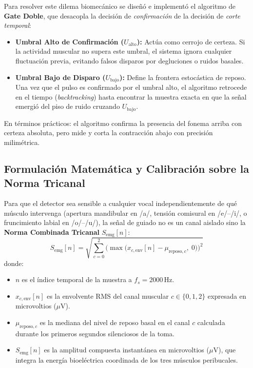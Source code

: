 \documentclass[11pt,a4paper,openany]{book}
\theoremstyle{definition}
\begin{document}
Para resolver este dilema biomecánico se diseñó e implementó el algoritmo de \textbf{Gate Doble}, que desacopla la decisión de \textit{confirmación} de la decisión de \textit{corte temporal}:
\begin{itemize}
    \item \textbf{Umbral Alto de Confirmación ($U_{\text{alto}}$):} Actúa como cerrojo de certeza. Si la actividad muscular no supera este umbral, el sistema ignora cualquier fluctuación previa, evitando falsos disparos por degluciones o ruidos basales.
    \item \textbf{Umbral Bajo de Disparo ($U_{\text{bajo}}$):} Define la frontera estocástica de reposo. Una vez que el pulso es confirmado por el umbral alto, el algoritmo retrocede en el tiempo (\textit{backtracking}) hasta encontrar la muestra exacta en que la señal emergió del piso de ruido cruzando $U_{\text{bajo}}$.
\end{itemize}
En términos prácticos: el algoritmo confirma la presencia del fonema arriba con certeza absoluta, pero mide y corta la contracción abajo con precisión milimétrica.

\subsection{Formulación Matemática y Calibración sobre la Norma Tricanal}
\label{subsec:matematica_gate_doble}

Para que el detector sea sensible a cualquier vocal independientemente de qué músculo intervenga (apertura mandibular en /a/, tensión comisural en /e/--/i/, o fruncimiento labial en /o/--/u/), la señal de guiado no es un canal aislado sino la \textbf{Norma Combinada Tricanal} $S_{\text{emg}}[n]$:
\begin{equation}
    S_{\text{emg}}[n] = \sqrt{ \sum_{c=0}^2 \Big( \max\big( x_{c,\text{env}}[n] - \mu_{\text{reposo}, c}, \; 0 \big) \Big)^2 }
    \label{eq:norma_tricanal}
\end{equation}
donde:
\begin{itemize}
    \item $n$ es el índice temporal de la muestra a $f_s = 2000\,\text{Hz}$.
    \item $x_{c,\text{env}}[n]$ es la envolvente RMS del canal muscular $c \in \{0, 1, 2\}$ expresada en microvoltios ($\mu\text{V}$).
    \item $\mu_{\text{reposo}, c}$ es la mediana del nivel de reposo basal en el canal $c$ calculada durante los primeros segundos silenciosos de la toma.
    \item $S_{\text{emg}}[n]$ es la amplitud compuesta instantánea en microvoltios ($\mu\text{V}$), que integra la energía bioeléctrica coordinada de los tres músculos peribucales.
\end{itemize}
\end{document}

